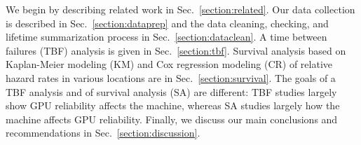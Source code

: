 We begin by describing related work in Sec.~\ref{section:related}. Our
data collection is described in Sec.~\ref{section:dataprep} and the
data cleaning, checking, and lifetime summarization process in
Sec.~\ref{section:dataclean}. A time between failures (TBF) analysis
is given in Sec.~\ref{section:tbf}. Survival analysis based on
Kaplan-Meier modeling (KM) and Cox regression modeling (CR) of
relative hazard rates in various locations are in
Sec.~\ref{section:survival}. The goals of a TBF analysis and of
survival analysis (SA) are different: TBF studies largely show GPU
reliability affects the machine, whereas SA studies largely how the
machine affects GPU reliability.  Finally, we discuss our main
conclusions and recommendations in Sec.~\ref{section:discussion}.
 


